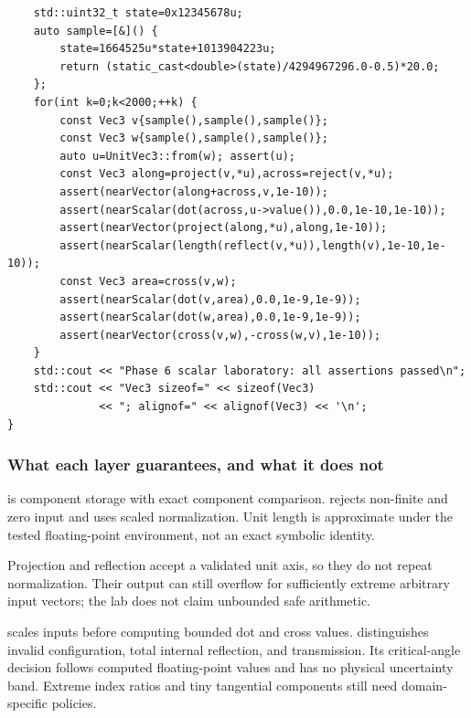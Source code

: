 \begin{verbatim}
    std::uint32_t state=0x12345678u;
    auto sample=[&]() {
        state=1664525u*state+1013904223u;
        return (static_cast<double>(state)/4294967296.0-0.5)*20.0;
    };
    for(int k=0;k<2000;++k) {
        const Vec3 v{sample(),sample(),sample()};
        const Vec3 w{sample(),sample(),sample()};
        auto u=UnitVec3::from(w); assert(u);
        const Vec3 along=project(v,*u),across=reject(v,*u);
        assert(nearVector(along+across,v,1e-10));
        assert(nearScalar(dot(across,u->value()),0.0,1e-10,1e-10));
        assert(nearVector(project(along,*u),along,1e-10));
        assert(nearScalar(length(reflect(v,*u)),length(v),1e-10,1e-10));
        const Vec3 area=cross(v,w);
        assert(nearScalar(dot(v,area),0.0,1e-9,1e-9));
        assert(nearScalar(dot(w,area),0.0,1e-9,1e-9));
        assert(nearVector(cross(v,w),-cross(w,v),1e-10));
    }
    std::cout << "Phase 6 scalar laboratory: all assertions passed\n";
    std::cout << "Vec3 sizeof=" << sizeof(Vec3)
              << "; alignof=" << alignof(Vec3) << '\n';
}
\end{verbatim}

\subsubsection{What each layer guarantees, and what it does not}\label{02-foundations-ii-ch037-what-each-layer-guarantees-and-what-it-does-not}

\hypertarget{02-foundations-ii-ch037-what-each-layer-guarantees-and-what-it-does-not}{}

 is component storage with exact component comparison.  rejects non-finite and zero input and uses scaled normalization. Unit length is approximate under the tested floating-point environment, not an exact symbolic identity.

Projection and reflection accept a validated unit axis, so they do not repeat normalization. Their output can still overflow for sufficiently extreme arbitrary input vectors; the lab does not claim unbounded safe arithmetic.

 scales inputs before computing bounded dot and cross values.  distinguishes invalid configuration, total internal reflection, and transmission. Its critical-angle decision follows computed floating-point values and has no physical uncertainty band. Extreme index ratios and tiny tangential components still need domain-specific policies.

